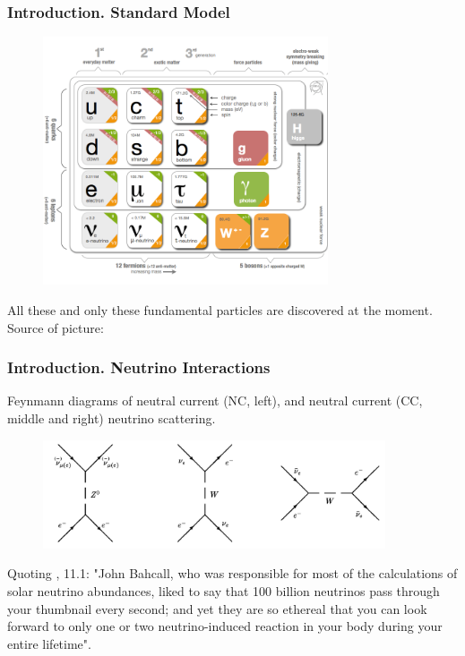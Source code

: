\begin{frame}\frametitle{Introduction. Standard Model}
\begin{figure}
\label{fig:StandardModel}
\centering 
\includegraphics[width=0.75\textwidth, keepaspectratio=true]{figs/StandardModel.png}
\end{figure}
\tiny
All these and only these fundamental particles are discovered at the moment. Source of picture: \cite{ref_fig_StandardModel}
\end{frame}

\begin{frame}\frametitle{Introduction. Neutrino Interactions}
\scriptsize
Feynmann diagrams of neutral current (NC, left), and neutral current (CC, middle and right) neutrino scattering.
\begin{figure}
\label{fig:NuScattering}
\centering
\includegraphics[width=0.90\textwidth, keepaspectratio=true]{figs/neutrinoScattering.png}
\end{figure}
Quoting \cite{ref_Griffiths}, 11.1: "John Bahcall, who was responsible for most of the calculations of solar neutrino abundances, liked to say that 100 billion neutrinos pass through your thumbnail every second; and yet they are so ethereal that you can look forward to only one or two neutrino-induced reaction in your body during your entire lifetime".\\
\end{frame}

